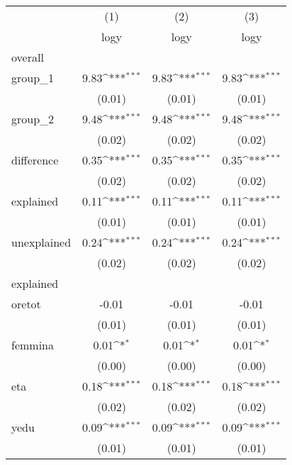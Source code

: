 {
\def\sym#1{\ifmmode^{#1}\else\(^{#1}\)\fi}
\begin{tabular}{l*{3}{c}}
\hline\hline
          &\multicolumn{1}{c}{(1)}&\multicolumn{1}{c}{(2)}&\multicolumn{1}{c}{(3)}\\
          &\multicolumn{1}{c}{logy}&\multicolumn{1}{c}{logy}&\multicolumn{1}{c}{logy}\\
\hline
overall   &                  &                  &                  \\
group\_1   &     9.83\sym{***}&     9.83\sym{***}&     9.83\sym{***}\\
          &   (0.01)         &   (0.01)         &   (0.01)         \\
[1em]
group\_2   &     9.48\sym{***}&     9.48\sym{***}&     9.48\sym{***}\\
          &   (0.02)         &   (0.02)         &   (0.02)         \\
[1em]
difference&     0.35\sym{***}&     0.35\sym{***}&     0.35\sym{***}\\
          &   (0.02)         &   (0.02)         &   (0.02)         \\
[1em]
explained &     0.11\sym{***}&     0.11\sym{***}&     0.11\sym{***}\\
          &   (0.01)         &   (0.01)         &   (0.01)         \\
[1em]
unexplained&     0.24\sym{***}&     0.24\sym{***}&     0.24\sym{***}\\
          &   (0.02)         &   (0.02)         &   (0.02)         \\
\hline
explained &                  &                  &                  \\
oretot    &    -0.01         &    -0.01         &    -0.01         \\
          &   (0.01)         &   (0.01)         &   (0.01)         \\
[1em]
femmina   &     0.01\sym{*}  &     0.01\sym{*}  &     0.01\sym{*}  \\
          &   (0.00)         &   (0.00)         &   (0.00)         \\
[1em]
eta       &     0.18\sym{***}&     0.18\sym{***}&     0.18\sym{***}\\
          &   (0.02)         &   (0.02)         &   (0.02)         \\
[1em]
yedu      &     0.09\sym{***}&     0.09\sym{***}&     0.09\sym{***}\\
          &   (0.01)         &   (0.01)         &   (0.01)         \\

\end{tabular}}
